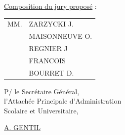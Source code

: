 \uline{Composition du jury proposé} : \begin{tabular}[t]{ll}
MM. & ZARZYCKI J.\\
& MAISONNEUVE O.\\
& REGNIER J\\
& FRANCOIS\\
& BOURRET D.
\end{tabular}

\begin{flushright}
P/ le Secrétaire Général,\\
l'Attachée Principale d'Administration\\
Scolaire et Universitaire,


\uline{A. GENTIL}
\end{flushright}

